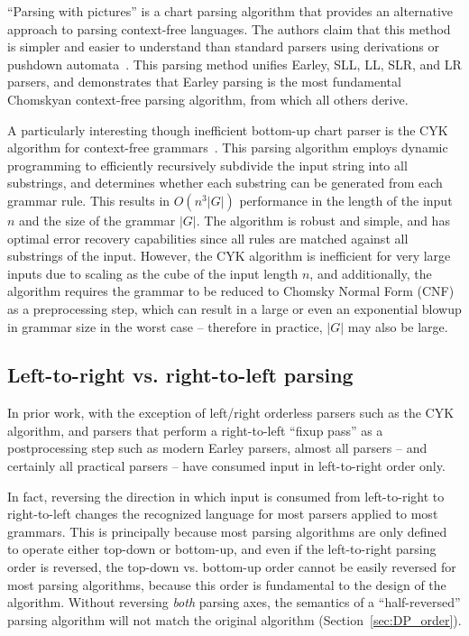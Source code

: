\documentclass[manuscript,screen]{acmart}
\begin{document}
``Parsing with pictures'' is a chart parsing algorithm that provides an alternative approach to parsing context-free languages. The authors claim that this method is simpler and easier to understand than standard parsers using derivations or pushdown automata~\citep{pingali2012}. This parsing method unifies Earley, SLL, LL, SLR, and LR parsers, and demonstrates that Earley parsing is the most fundamental Chomskyan context-free parsing algorithm, from which all others derive.

A particularly interesting though inefficient bottom-up chart parser is the CYK algorithm for context-free grammars~\citep{cocke1970,younger1967,kasami1966}. This parsing algorithm employs dynamic programming to efficiently recursively subdivide the input string into all substrings, and determines whether each substring can be generated from each grammar rule. This results in $O(n^3 |G|)$ performance in the length of the input $n$ and the size of the grammar $|G|$. The algorithm is robust and simple, and has optimal error recovery capabilities since all rules are matched against all substrings of the input. However, the CYK algorithm is inefficient for very large inputs due to scaling as the cube of the input length $n$, and additionally, the algorithm requires the grammar to be reduced to Chomsky Normal Form (CNF)~\citep{chomsky1959} as a preprocessing step, which can result in a large or even an exponential blowup in grammar size in the worst case -- therefore in practice, $|G|$ may also be large.

\subsection{Left-to-right vs. right-to-left parsing}

In prior work, with the exception of left/right orderless parsers such as the CYK algorithm, and parsers that perform a right-to-left ``fixup pass'' as a postprocessing step such as modern Earley parsers, almost all parsers -- and certainly all practical parsers -- have consumed input in left-to-right order only.

In fact, reversing the direction in which input is consumed from left-to-right to right-to-left changes the recognized language for most parsers applied to most grammars. This is principally because most parsing algorithms are only defined to operate either top-down or bottom-up, and even if the left-to-right parsing order is reversed, the top-down vs. bottom-up order cannot be easily reversed for most parsing algorithms, because this order is fundamental to the design of the algorithm. Without reversing \emph{both} parsing axes, the semantics of a ``half-reversed'' parsing algorithm will not match the original algorithm (Section~\ref{sec:DP_order}).
\end{document}
